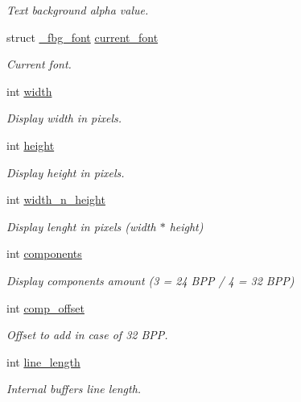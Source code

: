 \begin{DoxyCompactItemize}
\begin{DoxyCompactList}\small\item\em Text background alpha value. \end{DoxyCompactList}\item 
struct \mbox{\hyperlink{fbgraphics_8h_struct__fbg__font}{\+\_\+fbg\+\_\+font}} \mbox{\hyperlink{struct__fbg_a72868d703236aaabb7a5031703a6bbd8}{current\+\_\+font}}
\begin{DoxyCompactList}\small\item\em Current font. \end{DoxyCompactList}\item 
int \mbox{\hyperlink{struct__fbg_a1d3c76643e4ee424f4d17e27991d5e2e}{width}}
\begin{DoxyCompactList}\small\item\em Display width in pixels. \end{DoxyCompactList}\item 
int \mbox{\hyperlink{struct__fbg_a3a3bd409e71d020fa77f69a541d832f8}{height}}
\begin{DoxyCompactList}\small\item\em Display height in pixels. \end{DoxyCompactList}\item 
int \mbox{\hyperlink{struct__fbg_a1ab3f10e8c3483d7286db9850511d46d}{width\+\_\+n\+\_\+height}}
\begin{DoxyCompactList}\small\item\em Display lenght in pixels (width $\ast$ height) \end{DoxyCompactList}\item 
int \mbox{\hyperlink{struct__fbg_a1db77a2ef506723a575644dbc1cfb747}{components}}
\begin{DoxyCompactList}\small\item\em Display components amount (3 = 24 B\+PP / 4 = 32 B\+PP) \end{DoxyCompactList}\item 
int \mbox{\hyperlink{struct__fbg_a7c2e64d2f40575c8a989c759c30acb0e}{comp\+\_\+offset}}
\begin{DoxyCompactList}\small\item\em Offset to add in case of 32 B\+PP. \end{DoxyCompactList}\item 
int \mbox{\hyperlink{struct__fbg_af8a1ee8d7004e6f2193f2a3ed98f8ce8}{line\+\_\+length}}
\begin{DoxyCompactList}\small\item\em Internal buffers line length. \end{DoxyCompactList}\item 

\end{DoxyCompactItemize}
